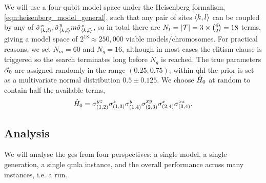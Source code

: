 We will use a four-qubit \gls{model space} under the Heisenberg formalism, \cref{eqn:heisenberg_model_general}, 
    such that any pair of sites ${ \langle k, l \rangle }$ can be coupled by any of $\hat{\sigma}^x_{{ \langle k, l \rangle }}, \hat{\sigma}^y_{{ \langle k, l \rangle }}m \hat{\sigma}^z_{{ \langle k, l \rangle }}$, 
    so in total there are $N_t = |\mathcal{T}| = 3 \times {4 \choose 2} = 18$ terms, 
    giving a \gls{model space} of $2^{18} \approx 250,000$ viable models/chromosomes. 
For practical reasons\footnotemark, we set $N_m=60$ and $N_g=16$, although in most cases the 
    elitism clause is triggered so the search terminates long before $N_g$ is reached. 
The true parameters $\vec{\alpha}_0$ are assigned randomly in the range $(0.25, 0.75)$; 
    within \gls{qhl} the prior is set as a multivariate normal distribution $0.5 \pm 0.125$. 
We choose $\hat{H}_0$ at random to contain half the available terms\footnotemark,
\begin{equation}
    \label{eqn:gen_alg_true_model}
    \hat{H}_0 = \sigma_{(1, 2)}^{yz}\sigma_{(1, 3)}^{z}\sigma_{(1, 4)}^{y}\sigma_{(2, 3)}^{xy}\sigma_{(2, 4)}^{x}\sigma_{(3, 4)}^{xz}.
\end{equation} 
\par 
\subsection{Analysis}
We will analyse the \gls{ges} from four perspectives: 
    a single model, a single generation, a single \gls{qmla} \gls{instance}, 
    and the overall performance across many instances, i.e. a \gls{run}.
\par 

